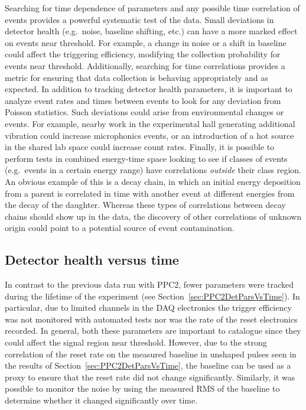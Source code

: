	Searching for time dependence of parameters and any possible time correlation of events provides a powerful systematic test of the data.  Small deviations in detector health (e.g.~noise, baseline shifting, etc.) can have a more marked effect on events near threshold.  For example, a change in noise or a shift in baseline could affect the triggering efficiency, modifying the collection probability for events near threshold.  Additionally, searching for time correlations provides a metric for ensuring that data collection is behaving appropriately and as expected.  In addition to tracking detector health parameters, it is important to analyze event rates and times between events to look for any deviation from Poisson statistics.  Such deviations could arise from environmental changes or events.  For example, nearby work in the experimental hall generating additional vibration could increase microphonics events, or an introduction of a hot source in the shared lab space could increase count rates.  Finally, it is possible to perform tests in combined energy-time space looking to see if classes of events (e.g.~events in a certain energy range) have correlations \emph{outside} their class region.  An obvious example of this is a decay chain, in which an initial energy deposition from a parent is correlated in time with another event at different energies from the decay of the daughter.  Whereas these types of correlations between decay chains should show up in the data, the discovery of other correlations of unknown origin could point to a potential source of event contamination.  
	
		\subsection{Detector health versus time}
		\label{sec:BeGeParsVsTime}

	In contrast to the previous data run with PPC2, fewer parameters were tracked during the lifetime of the experiment (see Section~\ref{sec:PPC2DetParsVsTime}).  In particular, due to limited channels in the DAQ electronics the trigger efficiency was not monitored with automated tests nor was the rate of the reset electronics recorded.  In general, both these parameters are important to catalogue since they could affect the signal region near threshold.  However, due to the strong correlation of the reset rate on  the measured baseline in unshaped pulses seen in the results of Section~\ref{sec:PPC2DetParsVsTime}, the baseline can be used as a proxy to ensure that the reset rate did not change significantly.  Similarly, it was possible to monitor the noise by using the measured RMS of the baseline to determine whether it changed significantly over time.  
	
